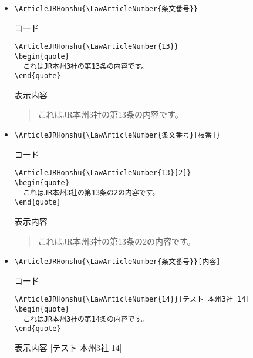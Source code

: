 \documentclass[oneside,10pt,a4paper]{jsarticle}
\begin{document}
  \begin{itemize}
    \item \verb|\ArticleJRHonshu{\LawArticleNumber{条文番号}}|
      \begin{itembox}[l]{コード}
        {\footnotesize\begin{verbatim}
\ArticleJRHonshu{\LawArticleNumber{13}}
\begin{quote}
  これはJR本州3社の第13条の内容です。
\end{quote}\end{verbatim}}
      \end{itembox}
      \begin{itembox}[l]{表示内容}
        \begin{quote}
          これはJR本州3社の第13条の内容です。
        \end{quote}
      \end{itembox}
    \item \verb|\ArticleJRHonshu{\LawArticleNumber{条文番号}[枝番]}|
      \begin{itembox}[l]{コード}
        {\footnotesize\begin{verbatim}
\ArticleJRHonshu{\LawArticleNumber{13}[2]}
\begin{quote}
  これはJR本州3社の第13条の2の内容です。
\end{quote}\end{verbatim}}
      \end{itembox}
      \begin{itembox}[l]{表示内容}
        \begin{quote}
          これはJR本州3社の第13条の2の内容です。
        \end{quote}
      \end{itembox}
    \newpage
    \item \verb|\ArticleJRHonshu{\LawArticleNumber{条文番号}}[内容]|
      \begin{itembox}[l]{コード}
        {\footnotesize\begin{verbatim}
\ArticleJRHonshu{\LawArticleNumber{14}}[テスト 本州3社 14]
\begin{quote}
  これはJR本州3社の第14条の内容です。
\end{quote}\end{verbatim}}
      \end{itembox}
      \begin{itembox}[l]{表示内容}
        [テスト 本州3社 14]

\end{itembox}
\end{itemize}
\end{document}
